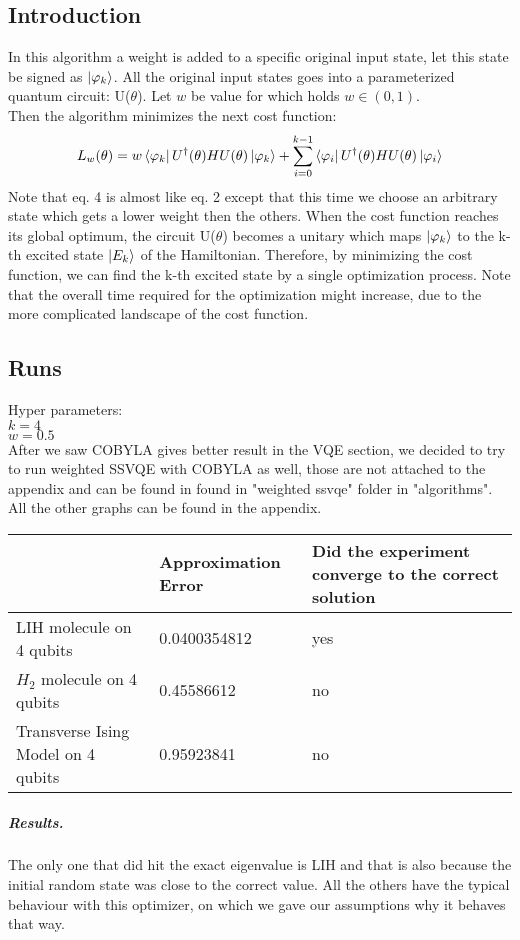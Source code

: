 \documentclass[12pt, a4paper]{article}
\begin{document}
    \subsection{Introduction}
    In this algorithm a weight is added to a specific original input state, let this state be signed as $\ket{\varphi_k}$. All the original input states goes into a parameterized quantum circuit: U($\theta$). Let $w$ be value for which holds $w \in (0,1)$.\\ Then the algorithm minimizes the next cost function:\\
    \begin{equation}
        L_w(\theta) = w \bra{\varphi_k} U^{\dagger}(\theta) H U(\theta) \ket{\varphi_k} +
        \sum_{i=0}^{k-1}{\bra{\varphi_i} U^{\dagger}(\theta) H U(\theta) \ket{\varphi_i}}
    \end{equation}
    Note that eq. 4 is almost like eq. 2 except that this time we choose an arbitrary state which gets a lower weight then the others.
    When the cost function reaches its global optimum, the circuit U($\theta$) becomes a unitary which maps $\ket{\varphi_k}$ to the k-th
    excited state
    $\ket{E_k}$ of the Hamiltonian.
    Therefore, by minimizing the cost function, we can find the k-th excited state by
    a single optimization process. Note that the overall time
    required for the optimization might increase, due to the
    more complicated landscape of the cost function.
    \subsection{Runs}
    Hyper parameters:\\
    $k = 4$\\
    $w = 0.5$\\
    After we saw COBYLA gives better result in the VQE section, we decided to try to run weighted SSVQE with COBYLA as well, those are not attached to the appendix and can be found in found in "weighted ssvqe" folder in "algorithms".
    All the other graphs can be found in the appendix.

    \begin{tabular}{|p{3cm}|p{3cm}|p{3cm}|}
        \hline
        & Approximation Error & Did the experiment converge to the correct solution   \\   \hline\hline
        LIH molecule on 4 qubits & 0.0400354812 & yes \\  \hline
        $H_2$ molecule on 4 qubits & 0.45586612 & no \\  \hline
        Transverse Ising Model on 4 qubits & 0.95923841 & no \\
        \hline
    \end{tabular}
    \subparagraph{Results.}
    \label{sec:for_k_convergence}
    The only one that did hit the exact eigenvalue is LIH and that is also because the initial random state was close to the correct value. All the others have the typical behaviour with this optimizer, on which we gave our assumptions why it behaves that way.
\end{document}
